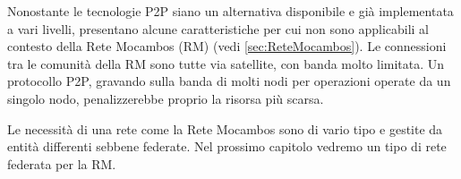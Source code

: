 Nonostante le tecnologie P2P siano un alternativa disponibile e già
implementata a vari livelli, presentano alcune caratteristiche per cui
non sono applicabili al contesto della Rete Mocambos (RM) (vedi
\ref{sec:ReteMocambos}). Le connessioni tra le comunità della RM sono
tutte via satellite, con banda molto limitata. Un protocollo P2P,
gravando sulla banda di molti nodi per operazioni operate da un
singolo nodo, penalizzerebbe proprio la risorsa più scarsa.

Le necessità di una rete come la Rete Mocambos sono di vario tipo e gestite da
entità differenti sebbene federate. Nel prossimo capitolo vedremo un
tipo di rete federata per la RM. 

